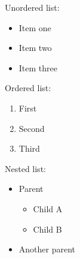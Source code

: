 Unordered list:

\begin{itemize}
\tightlist
\item Item one

\item Item two

\item Item three

\end{itemize}
Ordered list:

\begin{enumerate}
\tightlist
\item First

\item Second

\item Third

\end{enumerate}
Nested list:

\begin{itemize}
\tightlist
\item Parent

\begin{itemize}
\tightlist
\item Child A

\item Child B

\end{itemize}
\item Another parent

\end{itemize}
